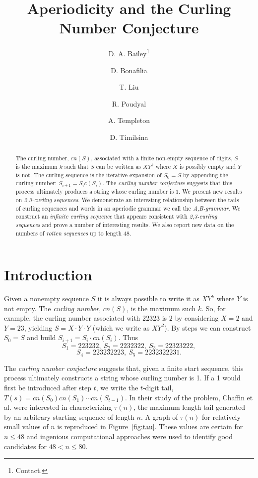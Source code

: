 \documentclass[11pt]{article}
\def\emph#1{{\em #1\/}}
\def\term#1{\emph{#1}}
\def\tail#1{{\tau(#1)}}
\begin{document}
\title{Aperiodicity and the Curling Number Conjecture}
\author{D. A. Bailey\thanks{Contact.}\and D. Bonafilia\and T. Liu\and R. Poudyal\and A. Templeton\and D. Timilsina}
\maketitle

\begin{abstract}
The curling number, $cn(S)$, associated with a finite non-empty sequence of
digits, $S$ is the maximum $k$ such that $S$ can be written as $XY^k$ where $X$
is possibly empty and $Y$ is not.  The curling sequence is the iterative
expansion of $S_0=S$ by appending the curling number: $S_{i+1}=S_ic(S_i)$.  
The \term{curling number conjecture} suggests that this process ultimately
produces a string whose curling number is $1$.  We present new results on
\term{2,3-curling sequences}.  We demonstrate an interesting relationship
between the tails of curling sequences and words in an aperiodic grammar we
call the \term{A,B-grammar}.  We construct an \term{infinite curling sequence}
that appears consistent with \term{2,3-curling sequences} and prove a number
of interesting results.  We also report new data on the numbers of
\term{rotten sequences} up to length $48$.
\end{abstract}

\section{Introduction}
 Given a nonempty sequence $S$ it is always possible to write it as $XY^k$
where $Y$ is not empty.  The \term{curling number}, $cn(S)$, is the maximum
such $k$.  So, for example, the curling number associated with $2 2 3 2 3$ is $2$ by considering $X=2$ and $Y=2 3$, yielding $S=X\cdot Y\cdot Y$ (which we
write as $XY^2$).  By steps we can construct $S_0=S$ and build $S_{i+1}=S_i\cdot cn(S_i)$.  Thus $$S_1=2 2 3 2 3 2,~S_2=2 2 3 2 3 2 2,~S_3=2 2 3 2 3 2 2 2,$$ $$S_4=2 2 3 2 3 2 2 2 3,~S_5=2 2 3 2 3 2 2 2 3 1.$$

The \term{curling number conjecture} suggests that, given a finite start
sequence, this process ultimately constructs a string whose curling number is
1.  If a 1 would first be introduced after step $t$, we write the $t$-digit
tail, $T(s)=cn(S_0)cn(S_1)\cdots cn(S_{t-1})$.  In their study of the problem,
Chaffin et al.\cite{Ch13} were interested in characterizing $\tail{n}$, the maximum
length tail generated by an arbitrary starting sequence of length $n$.
A graph of $\tail{n}$ for relatively small values of $n$ is reproduced in
Figure~\ref{fig:tau}.  These values are certain for $n\le 48$ and ingenious
computational approaches were used to identify good candidates for $48<n\le 80$.
\end{document}
